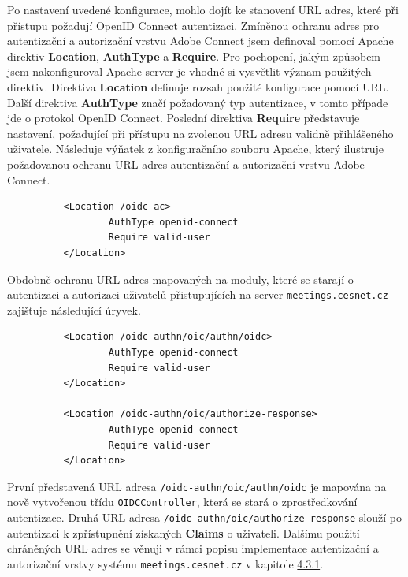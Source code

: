 \documentclass[
  printed, %
  twoside, %
  table,   %
  nolof,     %
  nolot,     %
]{fithesis3}
\begin{document}
Po nastavení uvedené konfigurace, mohlo dojít ke stanovení URL adres, které při přístupu požadují OpenID Connect autentizaci. Zmíněnou ochranu adres pro autentizační a autorizační vrstvu Adobe Connect jsem definoval pomocí Apache direktiv \textbf{Location}, \textbf{AuthType} a \textbf{Require}. Pro pochopení, jakým způsobem jsem nakonfiguroval Apache server je vhodné si vysvětlit význam použitých direktiv. Direktiva \textbf{Location} definuje rozsah použité konfigurace pomocí URL. Další direktiva \textbf{AuthType} značí požadovaný typ autentizace, v tomto případe jde o protokol OpenID Connect. Poslední direktiva \textbf{Require} představuje nastavení, požadující při přístupu na zvolenou URL adresu validně přihlášeného uživatele. Následuje výňatek z konfiguračního souboru Apache, který ilustruje požadovanou ochranu URL adres autentizační a autorizační vrstvu Adobe Connect.
\begin{lstlisting}
          <Location /oidc-ac>
                  AuthType openid-connect
                  Require valid-user
          </Location>
\end{lstlisting}
\label{ac-location}

Obdobně ochranu URL adres mapovaných na moduly, které se starají o autentizaci a autorizaci uživatelů přistupujících na server \texttt{meetings.cesnet.cz} zajišťuje následující úryvek. 

\begin{lstlisting}
          <Location /oidc-authn/oic/authn/oidc>
                  AuthType openid-connect
                  Require valid-user
          </Location>
          
          <Location /oidc-authn/oic/authorize-response>
                  AuthType openid-connect
                  Require valid-user
          </Location>
\end{lstlisting}
První představená URL adresa \texttt{/oidc-authn/oic/authn/oidc} je mapována na nově vytvořenou třídu \texttt{OIDCController}, která se stará o zprostředkování autentizace. Druhá URL adresa \texttt{/oidc-authn/oic/authorize-response} slouží po autentizaci k zpřístupnění získaných \textbf{Claims} o uživateli. Dalšímu použití  chráněných URL adres se věnuji v rámci popisu implementace autentizační a autorizační vrstvy systému \texttt{meetings.cesnet.cz} v kapitole \hyperref[ShongoImpl-authn]{4.3.1}.

\label{shongo-location}
\end{document}
